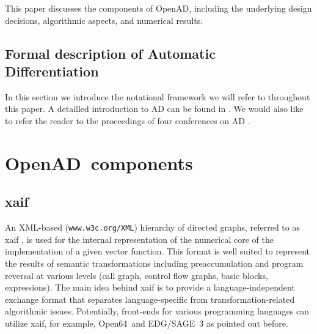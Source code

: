\documentclass[acmtocl,acmnow]{acmtrans2m}
\newcommand{\OpenAD}{OpenAD}
\newcommand{\OpenSixtyFour}{Open64}
\begin{document}
This paper discusses the components of \OpenAD,
including the underlying design decisions, algorithmic aspects, and
numerical results.
 





\subsection{Formal description of Automatic Differentiation}

In this section we introduce the notational framework we will refer to throughout 
this paper. A detailled introduction to AD can be found in \cite{Gri00}. 
We would also like to refer the reader to the proceedings of four conferences 
on AD \cite{CG91,BBCG96,CFG+01,BCH+05}.







\section{\OpenAD\ components}
\subsection{xaif} 
An XML-based ({\tt www.w3c.org/XML}) hierarchy of directed graphs, referred to as xaif 
\cite{HNN02}, is used for the 
internal representation of the numerical core of the implementation
of a given vector function. This format is 
well suited to represent the results of  semantic transformations including 
preaccumulation \cite{BiHa96,CDB96,GrRe91} and 
program reversal \cite{Gri92,WaGr01} at various levels (call graph, control 
flow graphs, basic blocks, expressions). 
The main idea behind xaif is to provide a language-independent exchange
format that separates language-specific from transformation-related 
algorithmic issues. Potentially, front-ends for various programming languages 
can utilize xaif, for example, \OpenSixtyFour\ and EDG/SAGE~3 as pointed out before.

\end{document}
